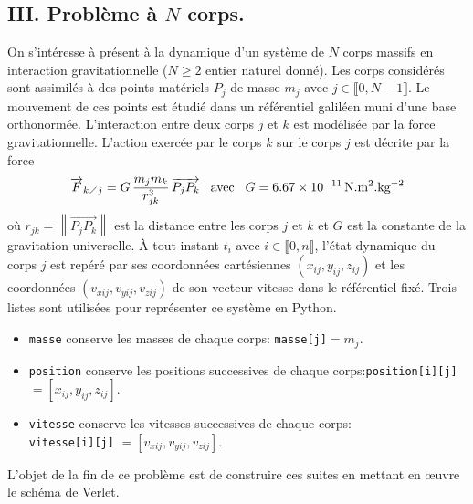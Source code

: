 \subsection*{III. Problème à $N$ corps.}
On s'intéresse à présent à la dynamique d'un système de $N$ corps massifs en interaction gravitationnelle ($N\geq 2$ entier naturel donné). Les corps considérés sont assimilés à des points matériels $P_j$ de masse $m_j$ avec $j\in \llbracket 0, N-1 \rrbracket$. Le mouvement de ces points est étudié dans un référentiel galiléen muni d'une base orthonormée. L'interaction entre deux corps $j$ et $k$ est modélisée par la force gravitationnelle. L'action exercée par le corps $k$ sur le corps $j$ est décrite par la force
\begin{displaymath}
  \overrightarrow{F}_{k\diagup j} = G\,\frac{m_j m_k}{r_{jk}^3}\, \overrightarrow{P_j P_k}\hspace{0.3cm} \text{avec} \hspace{0.3cm}
G=6.67\times 10^{-11}\,\text{N}.\text{m}^2.\text{kg}^{-2}  
\end{displaymath}
où $r_{jk} = \left\|\overrightarrow{P_j P_k}\right\|$ est la distance entre les corps $j$ et $k$ et $G$ est la constante de la gravitation universelle.\newline
\`A tout instant $t_i$ avec $i\in \llbracket 0,n \rrbracket$, l'état dynamique du corps $j$ est repéré par ses coordonnées cartésiennes $(x_{ij},y_{ij},z_{ij})$ et les coordonnées $(v_{xij},v_{yij},v_{zij})$ de son vecteur vitesse dans le référentiel fixé.\newline
Trois listes sont utilisées pour représenter ce système en Python.
\begin{itemize}
  \item \texttt{masse} conserve les masses de chaque corps: \texttt{masse[j]}$ = m_j$.
  \item \texttt{position} conserve les positions successives de chaque corps:\newline \texttt{position[i][j]} $=\left[ x_{ij}, y_{ij}, z_{ij}\right]$.
  \item \texttt{vitesse} conserve les vitesses successives de chaque corps:\\ \texttt{vitesse[i][j]} $=\left[ v_{xij}, v_{yij}, v_{zij}\right]$. 
\end{itemize}
L'objet de la fin de ce problème est de construire ces suites en mettant en \oe{}uvre le schéma de Verlet.

